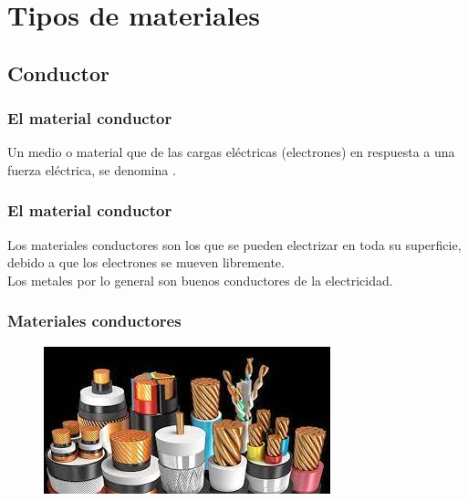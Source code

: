 \documentclass[14pt]{beamer}
\begin{document}
\section{Tipos de materiales}
\subsection{Conductor}

\begin{frame}
\frametitle{El material conductor}
Un medio o material que  de las cargas eléctricas (electrones)
en respuesta a una fuerza eléctrica, se denomina .
\end{frame}
\begin{frame}
\frametitle{El material conductor}    
Los materiales conductores son los que se pueden electrizar en toda su superficie, debido a que los electrones se mueven libremente.
\\
\bigskip
\pause
Los metales por lo general son buenos conductores de la electricidad.
\end{frame}
\begin{frame}
\frametitle{Materiales conductores}
\begin{figure}
    \centering
    \includegraphics[scale=0.8]{Imagenes/Materiales_Conductores_01.jpg}
\end{figure}
\end{frame}
\end{document}
